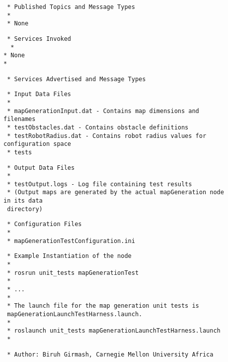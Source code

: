 \documentclass{CSSRforAfrica}
\newcommand{\checkboxChecked}{\fbox{\ding{51}}} %
\begin{document}
\begin{description}
\item[\checkboxChecked] 
 {\small 
\begin{verbatim}                    
 * Published Topics and Message Types
 *
 * None
\end{verbatim}}

\item[\checkboxChecked] 
 {\small 
\begin{verbatim}                    
 * Services Invoked
  *
* None
* 
\end{verbatim}}

\item[\checkboxChecked] 
 {\small 
\begin{verbatim}                    
 * Services Advertised and Message Types
\end{verbatim}}

\item[\checkboxChecked] 
 {\small 
\begin{verbatim}
 * Input Data Files
 *
 * mapGenerationInput.dat - Contains map dimensions and filenames
 * testObstacles.dat - Contains obstacle definitions
 * testRobotRadius.dat - Contains robot radius values for configuration space 
 * tests
\end{verbatim}}

\item[\checkboxChecked] 
 {\small 
\begin{verbatim}
 * Output Data Files
 *
 * testOutput.logs - Log file containing test results
 * (Output maps are generated by the actual mapGeneration node in its data 
 directory)
\end{verbatim}}

\item[\checkboxChecked] 
 {\small 
\begin{verbatim}
 * Configuration Files
 *
 * mapGenerationTestConfiguration.ini
\end{verbatim}}


\item[\checkboxChecked] 
 {\small 
\begin{verbatim} * Example Instantiation of the node
 *
 * rosrun unit_tests mapGenerationTest
 *
 * ...
 *
 * The launch file for the map generation unit tests is 
 mapGenerationLaunchTestHarness.launch.
 *
 * roslaunch unit_tests mapGenerationLaunchTestHarness.launch
 *
\end{verbatim}}

\item[\checkboxChecked] 
 {\small 
\begin{verbatim}
 * Author: Biruh Girmash, Carnegie Mellon University Africa
\end{verbatim}}


\end{description}
\end{document}
